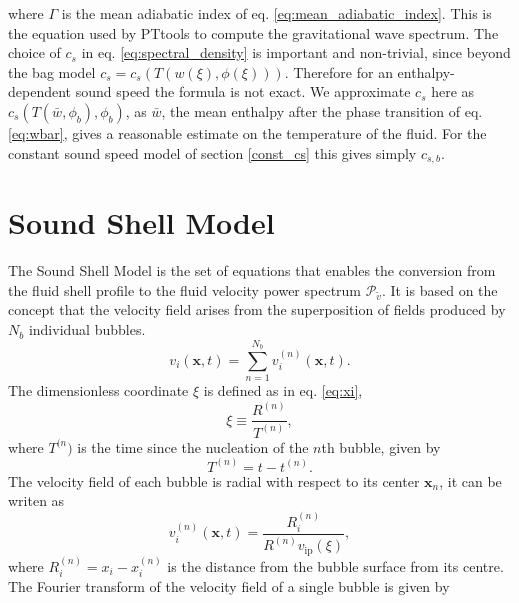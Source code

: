 where $\Gamma$ is the mean adiabatic index of eq. \eqref{eq:mean_adiabatic_index}.
This is the equation used by PTtools to compute the gravitational wave spectrum.
The choice of $c_s$ in eq. \eqref{eq:spectral_density} is important and non-trivial,
since beyond the bag model $c_s = c_s(T(w(\xi),\phi(\xi)))$.
Therefore for an enthalpy-dependent sound speed the formula is not exact.
We approximate $c_s$ here as $c_s(T(\bar{w},\phi_b),\phi_b)$,
as $\bar{w}$, the mean enthalpy after the phase transition of eq. \eqref{eq:wbar},
gives a reasonable estimate on the temperature of the fluid.
For the constant sound speed model of section \ref{const_cs} this gives simply $c_{s,b}$.


\section{Sound Shell Model}
\label{sound_shell_model}
The Sound Shell Model is the set of equations that enables the conversion from the fluid shell profile to the fluid velocity power spectrum $\mathcal{P}_\tilde{v}$.
It is based on the concept that the velocity field arises from the superposition of fields produced by $N_b$ individual bubbles.
\cite[eq. 4.1]{hindmarsh_gw_pt_2019}
\begin{equation}
v_i(\mathbf{x},t) = \sum_{n=1}^{N_b} v_i^{(n)} (\mathbf{x},t).
\end{equation}
The dimensionless coordinate $\xi$ is defined as in eq. \eqref{eq:xi},
\begin{equation}
\xi \equiv \frac{R^{(n)}}{T^{(n)}},
\end{equation}
where $T^{(n})$ is the time since the nucleation of the $n$th bubble, given by
\begin{equation}
T^{(n)} = t - t^{(n)}.
\label{eq:bubble_lifetime}
\end{equation}
The velocity field of each bubble is radial with respect to its center $\mathbf{x}_n$, it can be writen as
\cite[eq. 4.2]{hindmarsh_gw_pt_2019}
\begin{equation}
v_i^{(n)}(\mathbf{x},t) = \frac{R_i^{(n)}}{R^{(n)} v_\text{ip}(\xi)},
\end{equation}
where $R_i^{(n)} = x_i - x_i^{(n)}$ is the distance from the bubble surface from its centre.
The Fourier transform of the velocity field of a single bubble is given by
